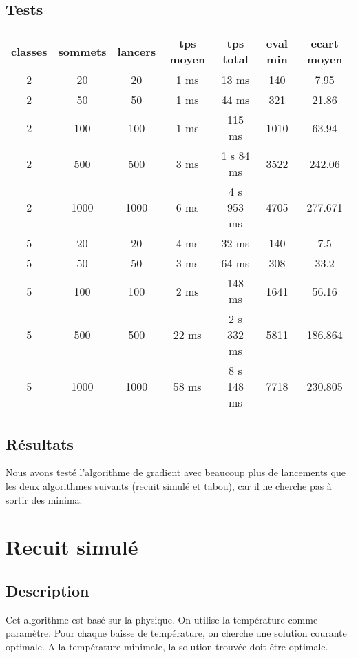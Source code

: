 \documentclass[12pt]{article}
\begin{document}
\subsection{Tests}

\begin{tabular}{|c|c|c|c|c|c|c|}
	\hline 
	classes & sommets & lancers & tps moyen & tps total & eval min & ecart moyen \\
	\hline
	2 & 20 & 20 & 1 ms & 13 ms & 140 & 7.95 \\
	\hline
	2 &  50  &  50  &  1   ms   &  44 ms   &  321  & 21.86 \\
	\hline
	2 &  100  &  100  & 1  ms   &  115 ms    &  1010   & 63.94  \\
	\hline
	2 &  500  &  500  &   3 ms  &  1  s  84  ms   & 3522  & 242.06\\
	\hline
	2 &  1000  &  1000  &  6  ms & 4  s 953 ms & 4705 & 277.671 \\
	\hline
	\hline
	5 &  20  &  20  & 4 ms &  32 ms    &  140   & 7.5 \\
	\hline
	5 &  50  &  50  & 3 ms &  64 ms   & 308 & 33.2 \\
	\hline
	5 &  100  & 100   & 2  ms   &  148 ms    & 1641 & 56.16 \\
	\hline
	5 & 500 & 500 & 22 ms   &  2 s 332 ms   &   5811  & 186.864 \\
	\hline
	5 &  1000  &  1000  & 58 ms &  8 s 148 ms & 7718 & 230.805 \\
	\hline
\end{tabular}

\subsection{Résultats}

Nous avons testé l’algorithme de gradient avec beaucoup plus de lancements que les deux algorithmes suivants (recuit simulé et tabou), car il ne cherche pas à sortir des minima.

\newpage

\section{Recuit simulé}
\subsection{Description}
Cet algorithme est basé sur la physique. On utilise la température comme paramètre. Pour chaque baisse de température, on cherche une solution courante optimale. A la température minimale, la solution trouvée doit être optimale.
\end{document}

